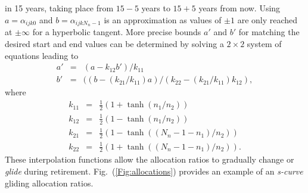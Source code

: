 \documentclass{report}[fleqn,12pt]
\begin{document}
\begin{description}[leftmargin=4em,style=multiline]
	in 15 years, taking place from $15-5$ years to $15+5$ years from now.
	Using $a = \alpha_{ijk0}$ and $b = \alpha_{ijkN_n-1}$ is an approximation as values of $\pm 1$
	are only reached at $\pm \infty$ for a hyperbolic tangent.
	More precise bounds $a'$ and $b'$ for matching the desired start and end values
	can be determined by solving a $2\times 2$ system of equations leading to
	\begin{eqnarray}
		a' &=& (a - k_{12}b')/k_{11} \nonumber \\
		b' &=& ((b - (k_{21}/k_{11})a)/(k_{22} - (k_{21}/k_{11})k_{12}),
	\end{eqnarray}
	where
	\begin{eqnarray}
		k_{11} &=& \frac{1}{2}(1 + \tanh(n_1/n_2)) \nonumber \\
		k_{12} &=& \frac{1}{2}(1 - \tanh(n_1/n_2)) \nonumber \\
		k_{21} &=& \frac{1}{2}(1 - \tanh((N_n-1-n_1)/n_2)) \nonumber \\
		k_{22} &=& \frac{1}{2}(1 + \tanh((N_n-1-n_1)/n_2)).
	\end{eqnarray}
	These interpolation functions allow the allocation ratios to gradually change
	or {\em glide} during retirement. Fig.~(\ref{Fig:allocations}) provides an example
	of an {\em s-curve} gliding allocation ratios.


\end{description}
\end{document}
